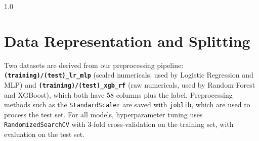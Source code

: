 \begin{spacing}{1.0}
\section{Data Representation and Splitting}

Two datasets are derived from our preprocessing pipeline: \textbf{\texttt{(training)/(test)\_lr\_mlp}} (scaled numericals, used by Logistic Regression and MLP) and \textbf{\texttt{(training)/(test)\_xgb\_rf}} (raw numericals, used by Random Forest and XGBoost), which both have 58 columns plus the label. Preprocessing methods such as the \texttt{StandardScaler} are saved with \texttt{joblib}, which are used to process the test set. For all models, hyperparameter tuning uses \texttt{RandomizedSearchCV} with 3-fold cross-validation on the training set, with evaluation on the test set.


\end{spacing}
